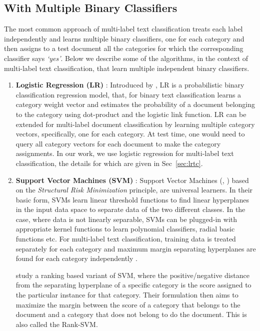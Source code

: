 \subsection{With Multiple Binary Classifiers}
\label{sec:rw_multiple_classifiers}
The most common approach of multi-label text classification treats each label independently and learns multiple binary classifiers, one for each category and then assigns to a test document all the categories for which the corresponding classifier says \emph{`yes'}. Below we describe some of the algorithms, in the context of multi-label text classification, that learn multiple independent binary classifiers.
\begin{enumerate}
\item{\textbf{Logistic Regression (LR)} : }Introduced by \citep{hosmer1989applied}, LR is a probabilistic binary classification regression model, that, for binary text classification learns a category weight vector and estimates the probability of a document belonging to the category using dot-product and the logistic link function. LR can be extended for multi-label document classification by learning multiple category vectors, specifically, one for each category. At test time, one would need to query all category vectors for each document to make the category assignments. In our work, we use logistic regression for multi-label text classification, the details for which are given in Sec~\ref{sec:lrtc}.

\item{\textbf{Support Vector Machines (SVM)} : } Support Vector Machines (\citep{cortes1995support}, \citep{vapnik2000nature}) based on the \emph{Structural Risk Minimization} principle, are universal learners. In their basic form, SVMs learn linear threshold functions to find linear hyperplanes in the input data space to separate data of the two different classes. In the case, where data is not linearly separable, SVMs can be plugged-in with appropriate kernel functions to learn polynomial classifiers, radial basic functions etc. For multi-label text classification, training data is treated separately for each category and maximum margin separating hyperplanes are found for each category independently \citep{joachims1998text}.

\cite{elisseeff2001kernel} study a ranking based variant of SVM, where the positive/negative distance from the separating hyperplane of a specific category is the score assigned to the particular instance for that category. Their formulation then aims to maximize the margin between the score of a category that belongs to the document and a category that does not belong to do the document. This is also called the Rank-SVM.


\end{enumerate}
